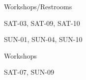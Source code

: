 \documentclass{article}
\newcommand{\room}[1]{
    \noindent
    #1
    \vspace{.2in}

}
\begin{document}
\rssheader[2in]
\vfill

\fontsize{36pt}{40pt}
\selectfont

\rssarrowleft[1in]

\begin{center}
\room{Workshops/Restrooms}
\fontsize{18pt}{24pt}
\selectfont
\room{SAT-03, SAT-09, SAT-10}
\room{SUN-01, SUN-04, SUN-10}
\end{center}

\vfill

\fontsize{36pt}{40pt}
\selectfont

\begin{minipage}{\textwidth}
    \begin{minipage}{.7\textwidth}
        \begin{center}
            \room{Workshops}
\fontsize{18pt}{24pt} \selectfont
            \room{SAT-07, SUN-09}
        \end{center}
    \end{minipage}
    \hfill
    \begin{minipage}{.25\textwidth}
        \begin{center}
            \rssarrowdown[1in]
        \end{center}
    \end{minipage}
\end{minipage}
\end{document}
